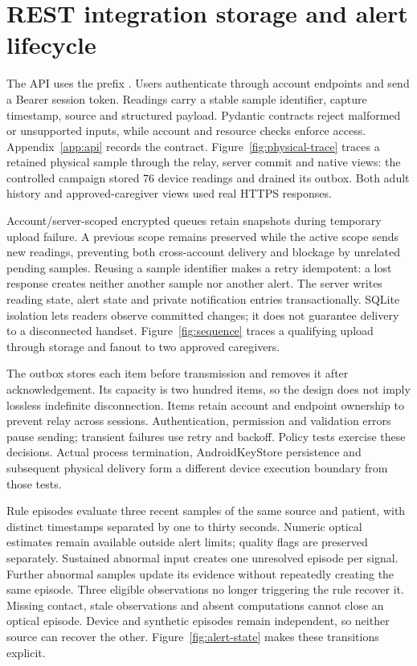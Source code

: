 \section{REST integration storage and alert lifecycle}
\label{sec:integration}
\begin{reportprose}
The API uses the prefix . Users authenticate through account endpoints and send a Bearer session token. Readings carry a stable sample identifier, capture timestamp, source and structured payload. Pydantic contracts reject malformed or unsupported inputs, while account and resource checks enforce access. Appendix~\ref{app:api} records the contract. Figure~\ref{fig:physical-trace} traces a retained physical sample through the relay, server commit and native views: the controlled campaign stored 76 device readings and drained its outbox. Both adult history and approved-caregiver views used real HTTPS responses.\cite{api,systemrun}

Account/server-scoped encrypted queues retain snapshots during temporary upload failure. A previous scope remains preserved while the active scope sends new readings, preventing both cross-account delivery and blockage by unrelated pending samples. Reusing a sample identifier makes a retry idempotent: a lost response creates neither another sample nor another alert. The server writes reading state, alert state and private notification entries transactionally. SQLite isolation lets readers observe committed changes; it does not guarantee delivery to a disconnected handset.\cite{sqlite} Figure~\ref{fig:sequence} traces a qualifying upload through storage and fanout to two approved caregivers.

The outbox stores each item before transmission and removes it after acknowledgement. Its capacity is two hundred items, so the design does not imply lossless indefinite disconnection. Items retain account and endpoint ownership to prevent relay across sessions. Authentication, permission and validation errors pause sending; transient failures use retry and backoff. Policy tests exercise these decisions. Actual process termination, AndroidKeyStore persistence and subsequent physical delivery form a different device execution boundary from those tests.

Rule episodes evaluate three recent samples of the same source and patient, with distinct timestamps separated by one to thirty seconds. Numeric optical estimates remain available outside alert limits; quality flags are preserved separately. Sustained abnormal input creates one unresolved episode per signal. Further abnormal samples update its evidence without repeatedly creating the same episode. Three eligible observations no longer triggering the rule recover it. Missing contact, stale observations and absent computations cannot close an optical episode. Device and synthetic episodes remain independent, so neither source can recover the other. Figure~\ref{fig:alert-state} makes these transitions explicit.


\end{reportprose}
